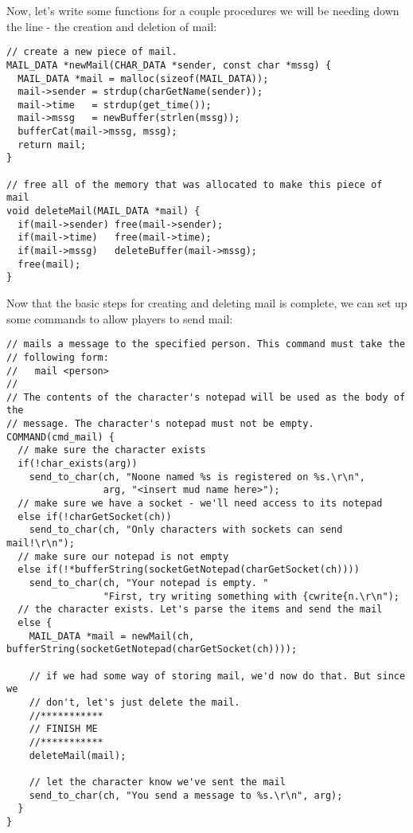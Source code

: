 \documentclass[12pt]{article}
\begin{document}
Now, let's write some functions for a couple procedures we will be needing down the line - the creation and deletion of mail:

{\bf \begin{verbatim}
// create a new piece of mail.
MAIL_DATA *newMail(CHAR_DATA *sender, const char *mssg) {
  MAIL_DATA *mail = malloc(sizeof(MAIL_DATA));
  mail->sender = strdup(charGetName(sender));
  mail->time   = strdup(get_time());
  mail->mssg   = newBuffer(strlen(mssg));
  bufferCat(mail->mssg, mssg);
  return mail;
}

// free all of the memory that was allocated to make this piece of mail
void deleteMail(MAIL_DATA *mail) {
  if(mail->sender) free(mail->sender);
  if(mail->time)   free(mail->time);
  if(mail->mssg)   deleteBuffer(mail->mssg);
  free(mail);
}
\end{verbatim}}

Now that the basic steps for creating and deleting mail is complete, we can 
set up some commands to allow players to send mail:

{\bf \begin{verbatim}
// mails a message to the specified person. This command must take the 
// following form:
//   mail <person>
//
// The contents of the character's notepad will be used as the body of the
// message. The character's notepad must not be empty.
COMMAND(cmd_mail) {
  // make sure the character exists
  if(!char_exists(arg))
    send_to_char(ch, "Noone named %s is registered on %s.\r\n",
                 arg, "<insert mud name here>");
  // make sure we have a socket - we'll need access to its notepad
  else if(!charGetSocket(ch))
    send_to_char(ch, "Only characters with sockets can send mail!\r\n");
  // make sure our notepad is not empty
  else if(!*bufferString(socketGetNotepad(charGetSocket(ch))))
    send_to_char(ch, "Your notepad is empty. "
                 "First, try writing something with {cwrite{n.\r\n");
  // the character exists. Let's parse the items and send the mail
  else {
    MAIL_DATA *mail = newMail(ch, bufferString(socketGetNotepad(charGetSocket(ch))));
    
    // if we had some way of storing mail, we'd now do that. But since we
    // don't, let's just delete the mail.
    //***********
    // FINISH ME
    //***********
    deleteMail(mail);

    // let the character know we've sent the mail
    send_to_char(ch, "You send a message to %s.\r\n", arg);
  }
}
\end{verbatim}}
\end{document}
